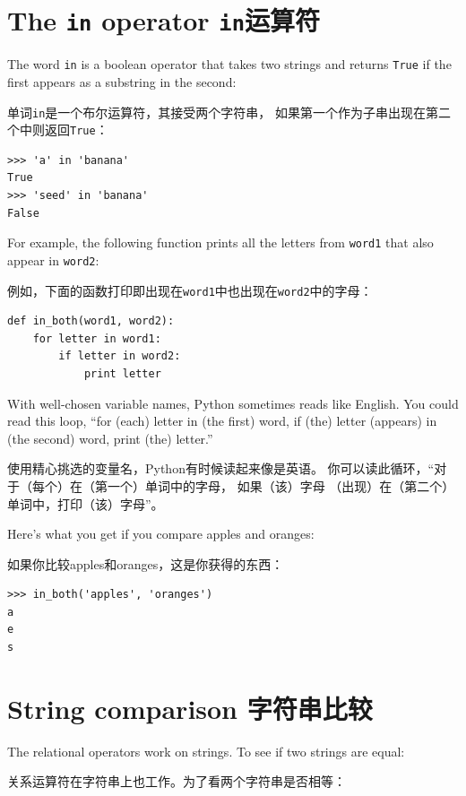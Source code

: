 \documentclass[10pt]{book}
\begin{document}
\begin{CJK}{UTF8}{gbsn}
\section{The {\tt in} operator {\tt in}运算符}
\label{inboth}

The word {\tt in} is a boolean operator that takes two strings and
returns {\tt True} if the first appears as a substring in the second:

单词{\tt in}是一个布尔运算符，其接受两个字符串，
如果第一个作为子串出现在第二个中则返回{\tt True}：

\begin{verbatim}
>>> 'a' in 'banana'
True
>>> 'seed' in 'banana'
False
\end{verbatim}
%
For example, the following function prints all the
letters from {\tt word1} that also appear in {\tt word2}:

例如，下面的函数打印即出现在{\tt word1}中也出现在{\tt word2}中的字母：

\begin{verbatim}
def in_both(word1, word2):
    for letter in word1:
        if letter in word2:
            print letter
\end{verbatim}
%
With well-chosen variable names,
Python sometimes reads like English.  You could read
this loop, ``for (each) letter in (the first) word, if (the) letter 
(appears) in (the second) word, print (the) letter.''

使用精心挑选的变量名，Python有时候读起来像是英语。
你可以读此循环，``对于（每个）在（第一个）单词中的字母，
如果（该）字母 （出现）在（第二个）单词中，打印（该）字母''。

Here's what you get if you compare apples and oranges:

如果你比较apples和oranges，这是你获得的东西：

\begin{verbatim}
>>> in_both('apples', 'oranges')
a
e
s
\end{verbatim}
%

\section{String comparison 字符串比较}

The relational operators work on strings.  To see if two strings are equal:

关系运算符在字符串上也工作。为了看两个字符串是否相等：


\end{CJK}
\end{document}
